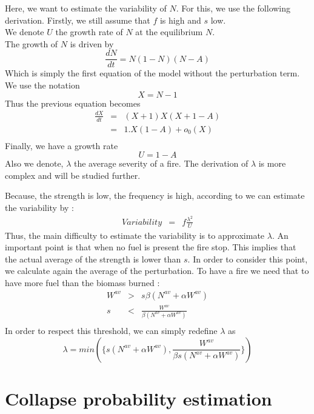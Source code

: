 \documentclass{article}
\begin{document}
Here, we want to estimate the variability of $N$. For this, we use the following derivation.
Firstly, we still assume that $f$ is high and $s$ low. 
\\
We denote $U$ the growth rate of $N$ at the equilibrium $N$. \\
The growth of $N$ is driven by  
\[
\frac{dN}{dt} = N(1-N)(N-A)
\]
Which is simply the first equation of the model without the perturbation term.
We use the notation
\[
X = N-1
\]
Thus the previous equation becomes
\[
\begin{array}{rcl}
\frac{dX}{dt} & = & (X+1)X(X+1-A) \\
& = & 1.X(1-A) + o_0(X) \\
\end{array}
\]
Finally, we have a growth rate 
\[
U = 1-A
\]
Also we denote, $\lambda$ the average severity of a fire. The derivation of $\lambda$ is more complex and will be studied further.

Because, the strength is low, the frequency is high, according to \cite{zelnik2018impact} we can estimate the variability by : 
\[
\begin{array}{rcl}
Variability & = & f\frac{\lambda^2}{U}
\end{array}
\]
Thus, the main difficulty to estimate the variability is to approximate $\lambda$. An important point is that when no fuel is present the fire stop. This implies that the actual average of the strength is lower than $s$. In order to consider this point, we calculate again the average of the perturbation. To have a fire we need that to have more fuel than the biomass burned :
\[
\begin{array}{rcl}
W^{av} & > & s\beta(N^{av}+\alpha W^{av}) \\
s & < & \frac{W^{av}}{\beta(N^{av}+\alpha W^{av})} \\
\end{array}
\]
In order to respect this threshold, we can simply redefine $\lambda$ as 
\[
\lambda = min(\{s(N^{av}+\alpha W^{av}), \frac{W^{av}}{\beta s (N^{av}+\alpha W^{av})}\})
\]





\newpage
\section{Collapse probability estimation}
\label{cp_derivation}
\end{document}
